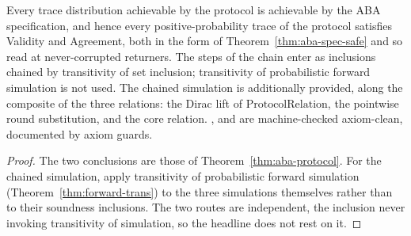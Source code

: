 \begin{theorem}
  \label{thm:aba-main}
  \leanok
  Every trace distribution achievable by the protocol is achievable by the ABA specification, and hence every positive-probability trace of the protocol satisfies Validity and Agreement, both in the form of Theorem~\ref{thm:aba-spec-safe} and so read at never-corrupted returners.
  The steps of the chain enter as inclusions chained by transitivity of set inclusion; transitivity of probabilistic forward simulation is not used.
  The chained simulation is additionally provided, along the composite of the three relations: the Dirac lift of $\mathrm{ProtocolRelation}$, the pointwise round substitution, and the core relation.
  ,  and  are machine-checked axiom-clean, documented by axiom guards.
\end{theorem}

\begin{proof}\leanok
  The two conclusions are those of Theorem~\ref{thm:aba-protocol}.
  For the chained simulation, apply transitivity of probabilistic forward simulation (Theorem~\ref{thm:forward-trans}) to the three simulations themselves rather than to their soundness inclusions.
  The two routes are independent, the inclusion never invoking transitivity of simulation, so the headline does not rest on it.
\end{proof}
